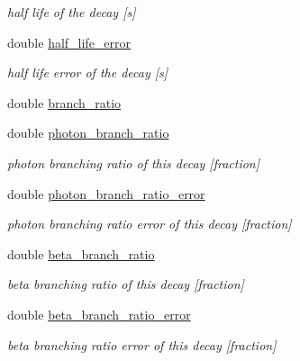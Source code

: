 \begin{DoxyCompactItemize}
\begin{DoxyCompactList}\small\item\em half life of the decay \mbox{[}s\mbox{]} \end{DoxyCompactList}\item 
\hypertarget{structpyne_1_1decay_a86b701ada7ee8d4a8fec95aedd711a87}{double \hyperlink{structpyne_1_1decay_a86b701ada7ee8d4a8fec95aedd711a87}{half\-\_\-life\-\_\-error}}\label{structpyne_1_1decay_a86b701ada7ee8d4a8fec95aedd711a87}

\begin{DoxyCompactList}\small\item\em half life error of the decay \mbox{[}s\mbox{]} \end{DoxyCompactList}\item 
double \hyperlink{structpyne_1_1decay_a21a58630e6aac8aa5517fb9d1bafe5d6}{branch\-\_\-ratio}
\item 
\hypertarget{structpyne_1_1decay_a7edc52996ae0705ac8c35fb6c437c3a8}{double \hyperlink{structpyne_1_1decay_a7edc52996ae0705ac8c35fb6c437c3a8}{photon\-\_\-branch\-\_\-ratio}}\label{structpyne_1_1decay_a7edc52996ae0705ac8c35fb6c437c3a8}

\begin{DoxyCompactList}\small\item\em photon branching ratio of this decay \mbox{[}fraction\mbox{]} \end{DoxyCompactList}\item 
\hypertarget{structpyne_1_1decay_a5492d786323042f5348897584065ec02}{double \hyperlink{structpyne_1_1decay_a5492d786323042f5348897584065ec02}{photon\-\_\-branch\-\_\-ratio\-\_\-error}}\label{structpyne_1_1decay_a5492d786323042f5348897584065ec02}

\begin{DoxyCompactList}\small\item\em photon branching ratio error of this decay \mbox{[}fraction\mbox{]} \end{DoxyCompactList}\item 
\hypertarget{structpyne_1_1decay_a566b715c5e41239f2c178880ae3dc3c5}{double \hyperlink{structpyne_1_1decay_a566b715c5e41239f2c178880ae3dc3c5}{beta\-\_\-branch\-\_\-ratio}}\label{structpyne_1_1decay_a566b715c5e41239f2c178880ae3dc3c5}

\begin{DoxyCompactList}\small\item\em beta branching ratio of this decay \mbox{[}fraction\mbox{]} \end{DoxyCompactList}\item 
\hypertarget{structpyne_1_1decay_afe2d8be6a39ee1dd7045a1970451f04e}{double \hyperlink{structpyne_1_1decay_afe2d8be6a39ee1dd7045a1970451f04e}{beta\-\_\-branch\-\_\-ratio\-\_\-error}}\label{structpyne_1_1decay_afe2d8be6a39ee1dd7045a1970451f04e}

\begin{DoxyCompactList}\small\item\em beta branching ratio error of this decay \mbox{[}fraction\mbox{]} \end{DoxyCompactList}\end{DoxyCompactItemize}



